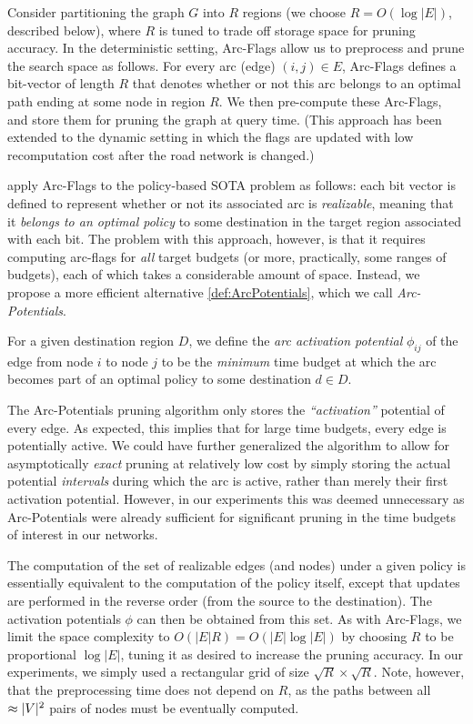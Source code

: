 \documentclass[oribibl]{llncs}
\DeclarePairedDelimiter{\abs}{\lvert}{\rvert}
\begin{document}
		Consider partitioning the graph $G$ into $R$ regions (we choose $R = O(\log |E|)$, described below),
		where $R$ is tuned to trade off storage space for pruning accuracy.
		In the deterministic setting, Arc-Flags allow us to preprocess and prune the search space as follows.
		For every arc (edge) $(i, j) \in E$, Arc-Flags defines a bit-vector of length $R$ that denotes whether
		or not this arc belongs to an optimal path ending at some node in region $R$.
		We then pre-compute these Arc-Flags, and store them for pruning the graph at query time.
		(This approach has been extended to the dynamic setting \cite{d2011dynamic}
		in which the flags are updated with low recomputation cost after the road network is changed.)

		\citet{sabran2014precomputation} apply Arc-Flags to the policy-based SOTA problem as follows:
		each bit vector is defined to represent whether or not its associated arc is \textit{realizable},
		meaning that it \textit{belongs to an optimal policy} to some destination
		in the target region associated with each bit.
		The problem with this approach, however, is that it requires computing arc-flags for \textit{all}
		target budgets (or more, practically, some ranges of budgets), each of which takes a considerable amount of space.
		Instead, we propose a more efficient alternative \ref{def:ArcPotentials}, which we call \textit{Arc-Potentials}.
		\begin{definition}
			\label{def:ArcPotentials}
			For a given destination region $D$,
			we define the \textit{arc activation potential} $\phi_{ij}$ of the edge from
			node $i$ to node $j$ to be the
			\textit{minimum} time budget at which the arc becomes part of an optimal policy to some
			destination $d \in D$.
		\end{definition}

		The Arc-Potentials pruning algorithm only stores the \textit{``activation''} potential of every edge.
		As expected, this implies that for large time budgets, every edge is potentially active.
		We could have further generalized the algorithm to allow for asymptotically \textit{exact}
		pruning at relatively low cost by simply storing the actual potential \textit{intervals}
		during which the arc is active, rather than merely their first activation potential.
		However, in our experiments this was deemed unnecessary as Arc-Potentials were already
		sufficient for significant pruning in the time budgets of interest in our networks.

		The computation of the set of realizable edges (and nodes) under a given policy
		is essentially equivalent to the computation of the policy itself,
		except that updates are performed in the reverse order (from the source to the destination).
		The activation potentials $\phi$ can then be obtained from this set.
		As with Arc-Flags, we limit the space complexity to $O(|E| R) = O(|E| \log |E|)$
		by choosing $R$ to be proportional $\log|E|$,
		tuning it as desired to increase the pruning accuracy.
		In our experiments, we simply used a rectangular grid of size $\sqrt{R}\times \sqrt{R}$.
		Note, however, that the preprocessing time does not depend on $R$,
		as the paths between all $\approx\abs{V}^2$ pairs of nodes must be eventually computed.
\end{document}
